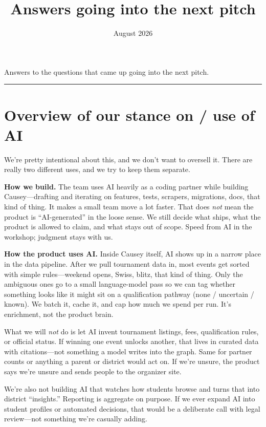 \documentclass[11pt]{article}
\title{Answers going into the next pitch}
\author{}
\date{August 2026}
\begin{document}
\maketitle

\noindent Answers to the questions that came up going into the next pitch.

\vspace{0.5em}
\hrule
\vspace{1em}

\section*{Overview of our stance on / use of AI}

We're pretty intentional about this, and we don't want to oversell it. There are really two different uses, and we try to keep them separate.

\textbf{How we build.} The team uses AI heavily as a coding partner while building Causey---drafting and iterating on features, tests, scrapers, migrations, docs, that kind of thing. It makes a small team move a lot faster. That does \emph{not} mean the product is ``AI-generated'' in the loose sense. We still decide what ships, what the product is allowed to claim, and what stays out of scope. Speed from AI in the workshop; judgment stays with us.

\textbf{How the product uses AI.} Inside Causey itself, AI shows up in a narrow place in the data pipeline. After we pull tournament data in, most events get sorted with simple rules---weekend opens, Swiss, blitz, that kind of thing. Only the ambiguous ones go to a small language-model pass so we can tag whether something looks like it might sit on a qualification pathway (none / uncertain / known). We batch it, cache it, and cap how much we spend per run. It's enrichment, not the product brain.

What we will \emph{not} do is let AI invent tournament listings, fees, qualification rules, or official status. If winning one event unlocks another, that lives in curated data with citations---not something a model writes into the graph. Same for partner counts or anything a parent or district would act on. If we're unsure, the product says we're unsure and sends people to the organizer site.

We're also not building AI that watches how students browse and turns that into district ``insights.'' Reporting is aggregate on purpose. If we ever expand AI into student profiles or automated decisions, that would be a deliberate call with legal review---not something we're casually adding.
\end{document}
